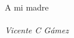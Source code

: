 \begin{dedication}
    {\altone\fontsize{30}{32}\selectfont A mi madre} \\ 
    ~\\
    {\altone\fontsize{18}{20}\selectfont\itshape Vicente C Gámez}
\end{dedication}